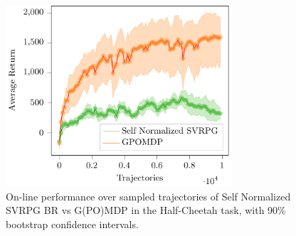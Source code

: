\begin{figure}[h]
	\begin{minipage}[h]{1\textwidth}
		\centering
		\includegraphics[width=0.75\textwidth]{Images/Experiments/half_cheetah_GPOMDP_vs_SN_SVRPG_B_reuse.pdf}
		\vspace{-0.1in}
		\caption{On-line performance over sampled trajectories of Self Normalized \acs{SVRPG} BR vs G(PO)MDP in the Half-Cheetah task, with 90\% bootstrap confidence intervals.}
		\label{fig:hcten}
	\end{minipage}
	\vspace{-0.15in}
\end{figure}


